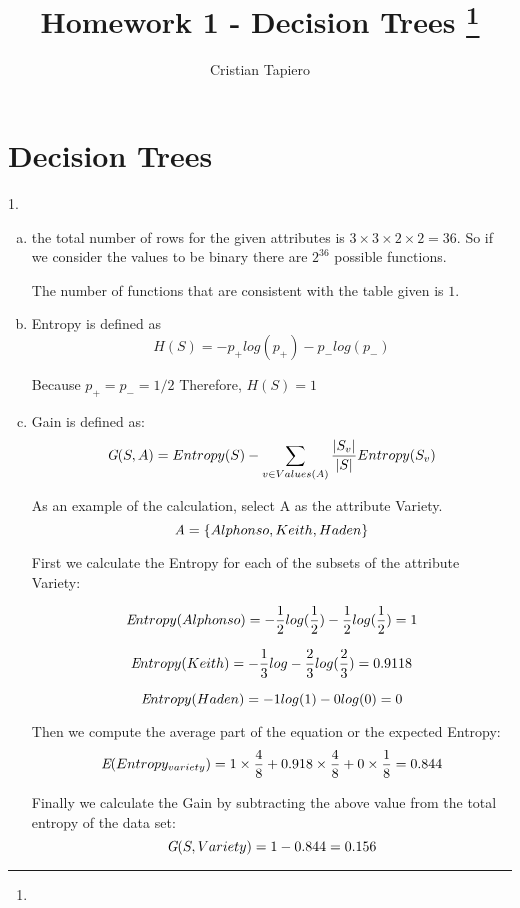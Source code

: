 \documentclass[11pt]{article}
\title{Homework 1 - Decision Trees
	\footnote{\s{CS 6350 Machine Learning; \;\; Spring 2024 \hfill
			Instructor: Vivek Kumar, University of Utah}
	}
}
\author{Cristian Tapiero}
\begin{document}
	\maketitle
	
	
	
	
	
	\section{Decision Trees}
	1.
	\begin{enumerate}[(a)] %
		\item the total number of rows for the given attributes is $3\times3\times2\times2 = 36.$  
		So if we consider the values to be binary  there are $2^{36}$ possible functions.
		
		The number of functions that are consistent with the table given is $1.$
		
		\item Entropy is defined as $$H(S) =-p_+ log (p_+)-p_- log(p_-)$$
		
		Because $p_+ = p_- = 1/2$ Therefore, $H(S) = 1$
		
		\item Gain is defined as: $$\textit G(S,A) = Entropy(S) - \sum_{v\in Values(A)} \frac{|S_v|}{|S|} Entropy(S_v)$$ 
		
		As an example of the calculation, select A as the attribute Variety.
		$$\textit A = \{Alphonso,Keith,Haden\}$$
		
		First we calculate the Entropy for each of the subsets of the attribute Variety:
		
		$$\textit Entropy(Alphonso) = - \frac{1}{2}log(\frac{1}{2}) - \frac{1}{2}  log(\frac{1}{2}) = 1$$
		
		$$\textit Entropy(Keith) = -\frac{1}{3}log -\frac{2}{3} log(\frac{2}{3}) = 0.9118$$
		
		$$\textit Entropy(Haden) = -1log(1) - 0 log(0) = 0$$
		
		Then we compute the average part of the equation or the expected Entropy:
		$$\textit E(Entropy_{variety}) = 1 \times \frac{4}{8} + 0.918\times \frac{4}{8} + 0 \times \frac{1}{8} = 0.844$$
		
		Finally we calculate the Gain by subtracting the above value from the total entropy of the data set:
		$$\textit G(S,Variety) =  1 - 0.844 = 0.156 $$
		

\end{enumerate}
\end{document}
